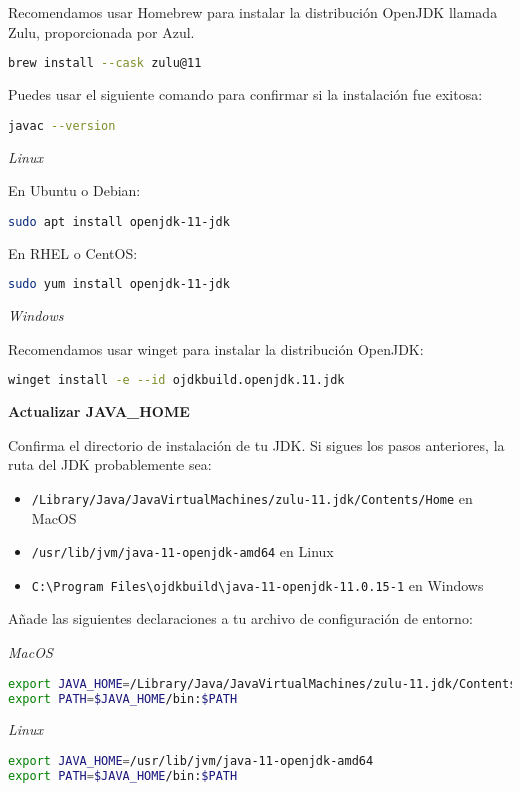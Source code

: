 Recomendamos usar Homebrew para instalar la distribución OpenJDK llamada Zulu, proporcionada por Azul.
\begin{lstlisting}[language=bash]
brew install --cask zulu@11
\end{lstlisting}

Puedes usar el siguiente comando para confirmar si la instalación fue exitosa:
\begin{lstlisting}[language=bash]
javac --version
\end{lstlisting}

\textit{Linux}

En Ubuntu o Debian:
\begin{lstlisting}[language=bash]
sudo apt install openjdk-11-jdk
\end{lstlisting}

En RHEL o CentOS:
\begin{lstlisting}[language=bash]
sudo yum install openjdk-11-jdk
\end{lstlisting}

\textit{Windows}

Recomendamos usar winget para instalar la distribución OpenJDK:
\begin{lstlisting}[language=bash]
winget install -e --id ojdkbuild.openjdk.11.jdk
\end{lstlisting}

\textbf{Actualizar JAVA\_HOME}

Confirma el directorio de instalación de tu JDK. Si sigues los pasos anteriores, la ruta del JDK probablemente sea:
\begin{itemize}
    \item \texttt{/Library/Java/JavaVirtualMachines/zulu-11.jdk/Contents/Home} en MacOS
    \item \texttt{/usr/lib/jvm/java-11-openjdk-amd64} en Linux
    \item \texttt{C:\textbackslash Program Files\textbackslash ojdkbuild\textbackslash java-11-openjdk-11.0.15-1} en Windows
\end{itemize}

Añade las siguientes declaraciones a tu archivo de configuración de entorno:

\textit{MacOS}
\begin{lstlisting}[language=bash]
export JAVA_HOME=/Library/Java/JavaVirtualMachines/zulu-11.jdk/Contents/Home
export PATH=$JAVA_HOME/bin:$PATH
\end{lstlisting}

\textit{Linux}
\begin{lstlisting}[language=bash]
export JAVA_HOME=/usr/lib/jvm/java-11-openjdk-amd64
export PATH=$JAVA_HOME/bin:$PATH
\end{lstlisting}

